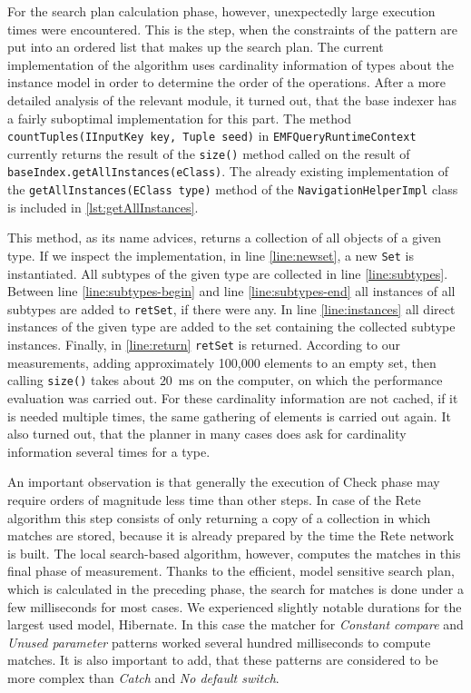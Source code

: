 For the search plan calculation phase, however, unexpectedly large execution times were encountered. This is the step, when the constraints of the pattern are put into an ordered list that makes up the search plan. The current implementation of the algorithm uses cardinality information of types about the instance model in order to determine the order of the operations. After a more detailed analysis of the relevant module, it turned out, that the base indexer has a fairly suboptimal implementation for this part. The method \texttt{countTuples(IInputKey key, Tuple seed)} in \texttt{EMFQueryRuntimeContext} currently returns the result of the \texttt{size()} method called on the result of \texttt{baseIndex.getAllInstances(eClass)}. The already existing implementation of the \texttt{getAllInstances(EClass type)} method of the \texttt{NavigationHelperImpl} class is included in \autoref{lst:getAllInstances}.


\begin{figure}[!htp]
\end{figure}

This method, as its name advices, returns a collection of all objects of a given type. If we inspect the implementation, in line \autoref{line:newset}, a new \texttt{Set} is instantiated. All subtypes of the given type are collected in line \autoref{line:subtypes}. Between line \autoref{line:subtypes-begin} and line \autoref{line:subtypes-end} all instances of all subtypes are added to \texttt{retSet}, if there were any. In line \autoref{line:instances} all direct instances of the given type are added to the set containing the collected subtype instances. Finally, in \autoref{line:return} \texttt{retSet} is returned. According to our measurements, adding approximately 100,000 elements to an empty set, then calling \texttt{size()} takes about $20$~ms on the computer, on which the performance evaluation was carried out. For these cardinality information are not cached, if it is needed multiple times, the same gathering of elements is carried out again. It also turned out, that the planner in many cases does ask for cardinality information several times for a type.

An important observation is that generally the execution of Check phase may require orders of magnitude less time than other steps. In case of the Rete algorithm this step consists of only returning a copy of a collection in which matches are stored, because it is already prepared by the time the Rete network is built. The local search-based algorithm, however, computes the matches in this final phase of measurement. Thanks to the efficient, model sensitive search plan, which is calculated in the preceding phase, the search for matches is done under a few milliseconds for most cases. We experienced slightly notable durations for the largest used model, Hibernate. In this case the matcher for \emph{Constant compare} and \emph{Unused parameter} patterns worked several hundred milliseconds to compute matches. It is also important to add, that these patterns are considered to be more complex than \emph{Catch} and \emph{No default switch}.

